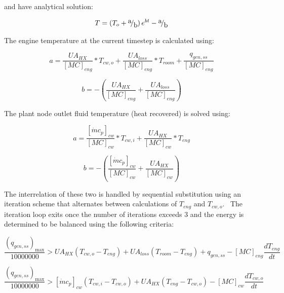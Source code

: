 and have analytical solution:

\begin{equation}
T = \left( {{T_o} + {\raise0.7ex\hbox{a} \!\mathord{\left/ {\vphantom {a b}}\right.}\!\lower0.7ex\hbox{b}}} \right){e^{bt}} - {\raise0.7ex\hbox{a} \!\mathord{\left/ {\vphantom {a b}}\right.}\!\lower0.7ex\hbox{b}}
\end{equation}

The engine temperature at the current timestep is calculated using:

\begin{equation}
a = \frac{{U{A_{HX}}}}{{{{[MC]}_{eng}}}}*{T_{cw,o}} + \frac{{U{A_{loss}}}}{{{{[MC]}_{eng}}}}*{T_{room}} + \frac{{{q_{gen,ss}}}}{{{{[MC]}_{eng}}}}
\end{equation}

\begin{equation}
b =  - \left( {\frac{{U{A_{HX}}}}{{{{[MC]}_{eng}}}} + \frac{{U{A_{loss}}}}{{{{[MC]}_{eng}}}}} \right)
\end{equation}

The plant node outlet fluid temperature (heat recovered) is solved using:

\begin{equation}
a = \frac{{{{[\dot m{c_p}]}_{cw}}}}{{{{[MC]}_{cw}}}}*{T_{cw,i}} + \frac{{U{A_{HX}}}}{{{{[MC]}_{cw}}}}*{T_{eng}}
\end{equation}

\begin{equation}
b =  - \left( {\frac{{{{[\dot m{c_p}]}_{cw}}}}{{{{[MC]}_{cw}}}} + \frac{{U{A_{HX}}}}{{{{[MC]}_{cw}}}}} \right)
\end{equation}

The interrelation of these two is handled by sequential substitution using an iteration scheme that alternates between calculations of \({T_{eng}}\) and \({T_{cw,o}}\).~ The iteration loop exits once the number of iterations exceeds 3 and the energy is determined to be balanced using the following criteria:

\begin{equation}
\frac{{{{\left( {{q_{gen,ss}}} \right)}_{\max }}}}{{10000000}} > U{A_{HX}}\left( {{T_{cw,o}} - {T_{eng}}} \right) + U{A_{loss}}\left( {{T_{room}} - {T_{eng}}} \right) + {q_{gen,ss}} - {[MC]_{eng}}\frac{{d{T_{eng}}}}{{dt}}
\end{equation}

\begin{equation}
\frac{{{{\left( {{q_{gen,ss}}} \right)}_{\max }}}}{{10000000}} > {[\dot m{c_p}]_{cw}}\left( {{T_{cw,i}} - {T_{cw,o}}} \right) + U{A_{HX}}\left( {{T_{eng}} - {T_{cw,o}}} \right) - {[MC]_{cw}}\frac{{d{T_{cw,o}}}}{{dt}}
\end{equation}

